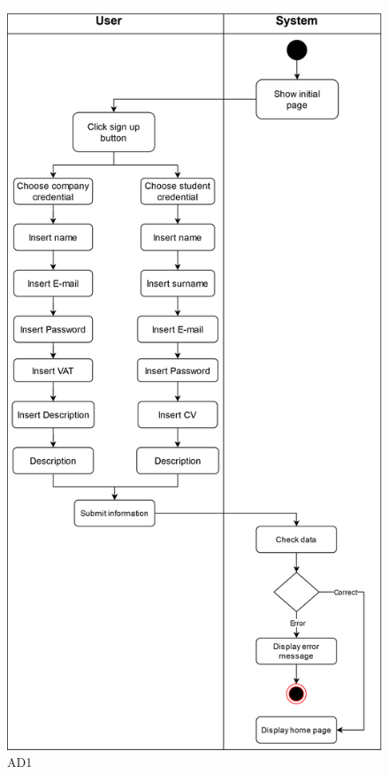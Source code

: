 \begin{figure}[H]
    \centering
    \includegraphics[width=0.75\linewidth]{Images/UseCasesDiagrams-Register.png}
    \caption{AD1}
    \label{AD1}
\end{figure}

